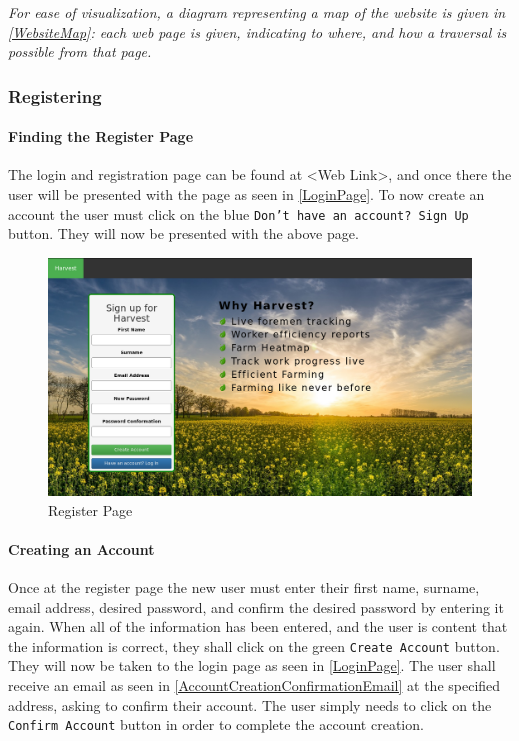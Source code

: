 \documentclass[11pt]{article}
\begin{document}
\textit{For ease of visualization, a diagram representing a map of the website is given in \ref{WebsiteMap}: each web page is given, indicating to where, and how a traversal is possible from that page.}

\subsubsection{Registering}
\paragraph{Finding the Register Page}The login and registration page can be found at <Web Link>, and once there the user will be presented with the page as seen in \ref{LoginPage}. To now create an account the user must click on the blue \texttt{Don't have an account? Sign Up} button. They will now be presented with the above page.

\begin{figure}
 \centering
 \includegraphics[width=12cm, keepaspectratio]{Images/Register-Page.png}
 \caption{Register Page}
 \label{RegisterPage}
\end{figure}

\paragraph{Creating an Account}Once at the register page the new user must enter their first name, surname, email address, desired password, and confirm the desired password by entering it again. When all of the information has been entered, and the user is content that the information is correct, they shall click on the green \texttt{Create Account} button. They will now be taken to the login page as seen in \ref{LoginPage}. The user shall receive an email as seen in \ref{AccountCreationConfirmationEmail} at the specified address, asking to confirm their account. The user simply needs to click on the \texttt{Confirm Account} button in order to complete the account creation.
\end{document}
